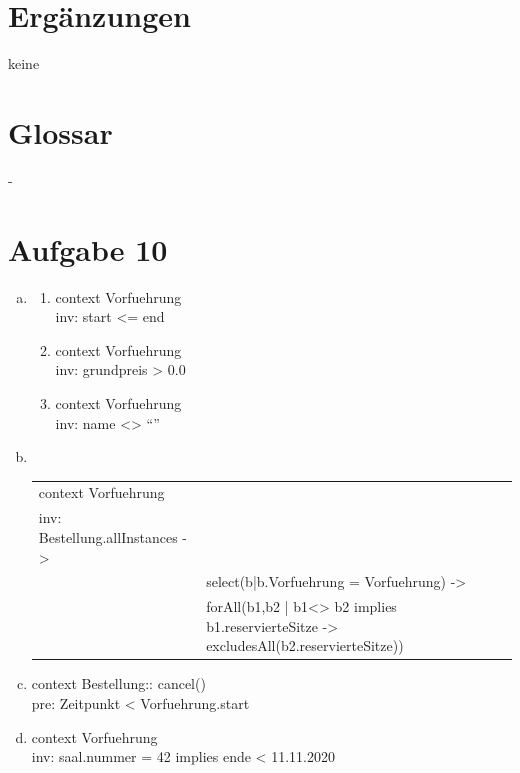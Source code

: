\section{Ergänzungen}
keine
\section*{Glossar}
-
\section*{Aufgabe 10}
\begin{enumerate} [a)]
	\item \begin{enumerate} [1.]
		\item context Vorfuehrung \\
		inv: start <= end
		\item context Vorfuehrung\\
		inv: grundpreis > 0.0
		\item context Vorfuehrung \\
		inv: name <> “”
	\end{enumerate}
\item \phantom{a}\\
\begin{tabular}{ll}
	context Vorfuehrung&\\
	inv: Bestellung.allInstances ->&\\
	&select(b|b.Vorfuehrung = Vorfuehrung) ->\\
	&forAll(b1,b2 | b1<> b2 implies b1.reservierteSitze -> excludesAll(b2.reservierteSitze))\\
\end{tabular}
\item context Bestellung:: cancel()\\
pre: Zeitpunkt < Vorfuehrung.start
\item context Vorfuehrung \\
inv: saal.nummer = 42 implies ende < 11.11.2020
\end{enumerate}
